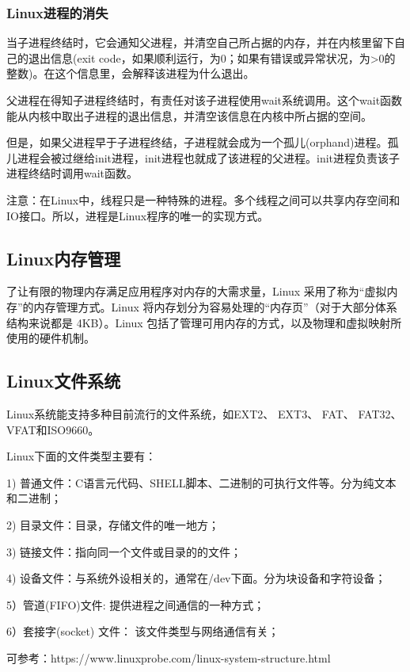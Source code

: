 \documentclass[UTF8]{article}%
\begin{document}
\subsubsection{Linux进程的消失}

当子进程终结时，它会通知父进程，并清空自己所占据的内存，并在内核里留下自己的退出信息(exit code，如果顺利运行，为0；如果有错误或异常状况，为>0的整数)。在这个信息里，会解释该进程为什么退出。

父进程在得知子进程终结时，有责任对该子进程使用wait系统调用。这个wait函数能从内核中取出子进程的退出信息，并清空该信息在内核中所占据的空间。

但是，如果父进程早于子进程终结，子进程就会成为一个孤儿(orphand)进程。孤儿进程会被过继给init进程，init进程也就成了该进程的父进程。init进程负责该子进程终结时调用wait函数。

注意：在Linux中，线程只是一种特殊的进程。多个线程之间可以共享内存空间和IO接口。所以，进程是Linux程序的唯一的实现方式。

\subsection{Linux内存管理}

了让有限的物理内存满足应用程序对内存的大需求量，Linux 采用了称为“虚拟内存”的内存管理方式。Linux 将内存划分为容易处理的“内存页”（对于大部分体系结构来说都是 4KB）。Linux 包括了管理可用内存的方式，以及物理和虚拟映射所使用的硬件机制。

\subsection{Linux文件系统}

Linux系统能支持多种目前流行的文件系统，如EXT2、 EXT3、 FAT、 FAT32、 VFAT和ISO9660。

Linux下面的文件类型主要有：

1) 普通文件：C语言元代码、SHELL脚本、二进制的可执行文件等。分为纯文本和二进制；

2) 目录文件：目录，存储文件的唯一地方；

3) 链接文件：指向同一个文件或目录的的文件；

4) 设备文件：与系统外设相关的，通常在/dev下面。分为块设备和字符设备；

5）管道(FIFO)文件: 提供进程之间通信的一种方式；

6）套接字(socket) 文件： 该文件类型与网络通信有关；

可参考：https://www.linuxprobe.com/linux-system-structure.html
\end{document}
